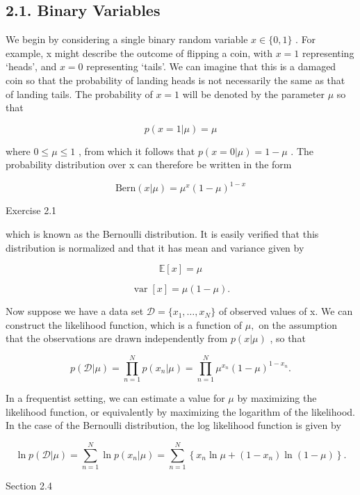 \documentclass[
  10
]{article}
\begin{document}
\subsection{2.1. Binary Variables}\label{binary-variables}

We begin by considering a single binary random variable
\(x \in \{ 0 , 1 \}\) . For example, x might describe the outcome of
flipping a coin, with \(x = 1\) representing `heads', and \(x = 0\)
representing `tails'. We can imagine that this is a damaged coin so that
the probability of landing heads is not necessarily the same as that of
landing tails. The probability of \(x = 1\) will be denoted by the
parameter \(\mu\) so that

\[
p (x = 1 | \mu) = \mu\tag{2.1}
\]

where \(0 \leqslant \mu \leqslant 1\) , from which it follows that
\(p ( x = 0 | \mu ) = 1 - \mu\) . The probability distribution over x
can therefore be written in the form

\[
\mathrm{Bern} (x | \mu) = \mu^ {x} (1 - \mu) ^ {1 - x}\tag{2.2}
\]

Exercise 2.1

which is known as the Bernoulli distribution. It is easily verified that
this distribution is normalized and that it has mean and variance given
by

\[
\mathbb {E} [ x ] = \mu\tag{2.3}
\]

\[
\operatorname{var} [ x ] = \mu (1 - \mu).\tag{2.4}
\]

Now suppose we have a data set
\(\mathcal { D } = \{ x _ { 1 } , \ldots , x _ { N } \}\) of observed
values of x. We can construct the likelihood function, which is a
function of \(\mu ,\) on the assumption that the observations are drawn
independently from \(p ( x | \mu )\) , so that

\[
p (\mathcal {D} | \mu) = \prod_ {n = 1} ^ {N} p (x _ {n} | \mu) = \prod_ {n = 1} ^ {N} \mu^ {x _ {n}} (1 - \mu) ^ {1 - x _ {n}}.\tag{2.5}
\]

In a frequentist setting, we can estimate a value for \(\mu\) by
maximizing the likelihood function, or equivalently by maximizing the
logarithm of the likelihood. In the case of the Bernoulli distribution,
the log likelihood function is given by

\[
\ln p (\mathcal {D} | \mu) = \sum_ {n = 1} ^ {N} \ln p (x _ {n} | \mu) = \sum_ {n = 1} ^ {N} \left\{x _ {n} \ln \mu + (1 - x _ {n}) \ln (1 - \mu) \right\}.\tag{2.6}
\]

Section 2.4
\end{document}
